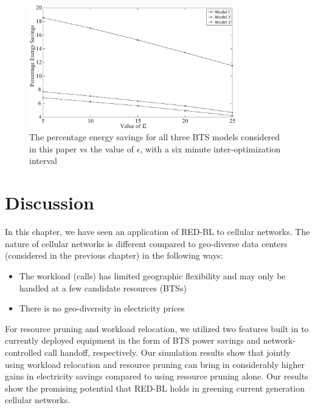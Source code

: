 \begin{figure}
\centering
\includegraphics[width=0.8\textwidth]{pics/ilyas7.eps}
\caption{The percentage energy savings for all three BTS models considered in this paper vs the value of $\epsilon$, with a six minute inter-optimization interval}
\label{fig:case2:results6}
\end{figure}

\section{Discussion}
\label{sec:discuss:case2} In this chapter, we have seen an application of RED-BL to cellular networks. The nature of cellular networks is different compared to geo-diverse data centers (considered in the previous chapter) in the following ways:

\begin{itemize}
\item The workload (calls) has limited geographic flexibility and may only be handled at a few candidate resources (BTSs)
\item There is no geo-diversity in electricity prices
\end{itemize}

For resource pruning and workload relocation, we utilized two features built in to currently deployed equipment in the form of BTS power savings and network-controlled call handoff, respectively. Our simulation results show that jointly using workload relocation and resource pruning can bring in considerably higher gains in electricity savings compared to using resource pruning alone. Our results show the promising potential that RED-BL holds in greening current generation cellular networks.